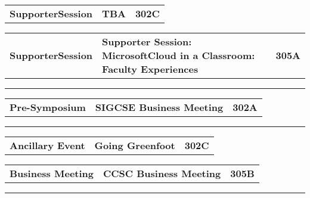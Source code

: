 \begin{longtable}[l]{@{}p{1in}@{}p{3in}@{}r}
    {\sffamily\large\textbf{SupporterSession}} & 
    {\sffamily\large\textbf{TBA}} & 
    {\sffamily\large\textbf{302C}} \\
\end{longtable}    
\begin{longtable}[l]{@{}p{1in}@{}p{3in}@{}r}
    {\sffamily\large\textbf{SupporterSession}} & 
    {\sffamily\large\textbf{Supporter Session: MicrosoftCloud in a Classroom:  Faculty Experiences}} & 
    {\sffamily\large\textbf{305A}} \\
\end{longtable}    
\vspace{0.5em}
\noindent\rule{5in}{0.02cm}
\vspace{0.5em}
\noindent
{}
\begin{longtable}[l]{@{}p{1in}@{}p{3in}@{}r}
    {\sffamily\large\textbf{Pre-Symposium}} & 
    {\sffamily\large\textbf{SIGCSE Business Meeting}} & 
    {\sffamily\large\textbf{302A}} \\
\end{longtable}    
\vspace{0.5em}
\noindent\rule{5in}{0.02cm}
\vspace{0.5em}
\noindent
{}
\begin{longtable}[l]{@{}p{1in}@{}p{3in}@{}r}
    {\sffamily\large\textbf{Ancillary Event}} & 
    {\sffamily\large\textbf{Going Greenfoot}} & 
    {\sffamily\large\textbf{302C}} \\
\end{longtable}    
\begin{longtable}[l]{@{}p{1in}@{}p{3in}@{}r}
    {\sffamily\large\textbf{Business Meeting}} & 
    {\sffamily\large\textbf{CCSC Business Meeting}} & 
    {\sffamily\large\textbf{305B}} \\
\end{longtable}    
\vspace{0.5em}
\noindent\rule{5in}{0.02cm}
\vspace{0.5em}
\noindent
{}
